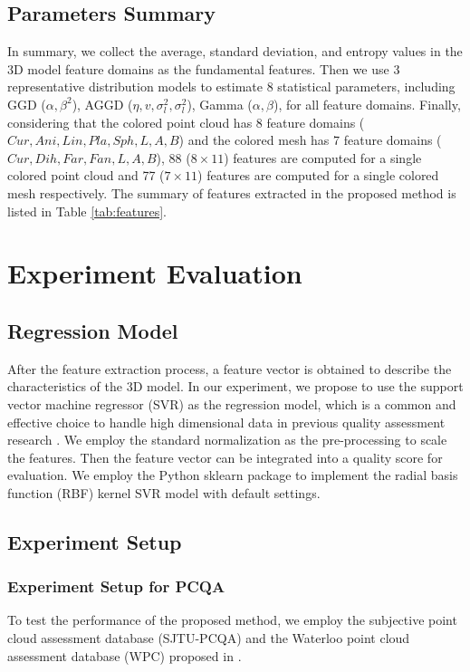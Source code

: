 \documentclass[lettersize,journal]{IEEEtran}
\begin{document}
\subsection{Parameters Summary}
In summary, we collect the average, standard deviation, and entropy values in the 3D model feature domains as the fundamental features. Then we use 3 representative distribution models to estimate 8 statistical parameters, including GGD ($\alpha,\beta^2$), AGGD ($\eta, v,\sigma_{l}^{2},\sigma_{l}^{2}$), Gamma ($\alpha,\beta$), for all feature domains. Finally, considering that the colored point cloud has 8 feature domains ($Cur, Ani, Lin, Pla, Sph, L,A,B$) and the colored mesh has 7 feature domains ($Cur, Dih, Far, Fan, L, A, B$), 88 ($8\times11$) features are computed for a single colored point cloud and 77 ($7\times11$) features are computed for a single colored mesh respectively. The summary of features extracted in the proposed method is listed in Table \ref{tab:features}.

  



\section{Experiment Evaluation}
\label{sec:experiment}

\subsection{Regression Model}
After the feature extraction process, a feature vector is obtained to describe the characteristics of the 3D model. In our experiment, we propose to use the support vector machine regressor (SVR) as the regression model, which is a common and effective choice to handle high dimensional data in previous quality assessment research \cite{nr-svr} \cite{brisque}. We employ the standard normalization as the pre-processing to scale the features. Then the feature vector can be integrated into a quality score for evaluation. We employ the Python sklearn package \cite{sklearn} to implement the radial basis function (RBF) kernel SVR model with default settings.








\subsection{Experiment Setup}
\subsubsection{Experiment Setup for PCQA}
 To test the performance of the proposed method, we employ the subjective point cloud assessment database (SJTU-PCQA) \cite{sjtu-pcqa} and the Waterloo point cloud assessment database (WPC) proposed in \cite{su2021perceptual}. 
 
\end{document}
